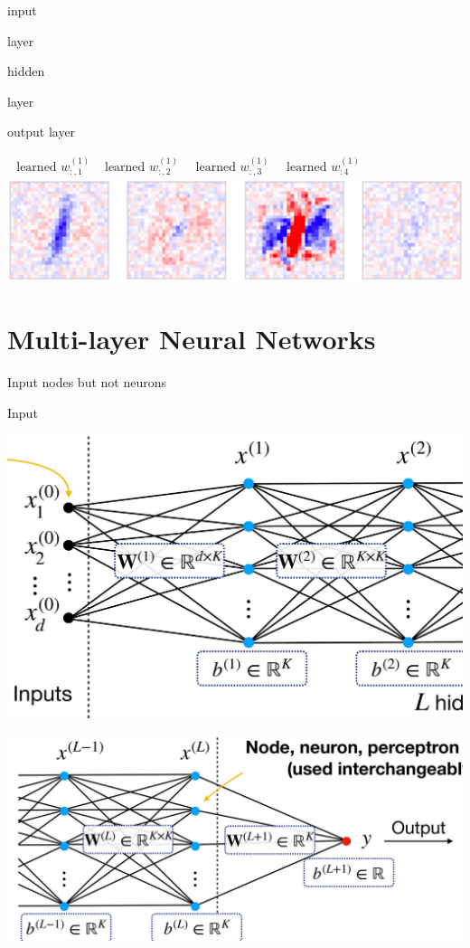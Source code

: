 \documentclass[10pt]{article}
\begin{document}
input

layer

hidden

layer

output layer

$\begin{array}{llll}\text { learned } w_{:, 1}^{(1)} & \text { learned } w_{:, 2}^{(1)} \quad \text { learned } w_{:, 3}^{(1)} \quad \text { learned } w_{: 4}^{(1)}\end{array}$
\includegraphics[max width=\textwidth, center]{2024_01_08_0e0dcffe4bc8c6049046g-07(1)}

\section*{Multi-layer Neural Networks}
Input nodes but not neurons

Input

\begin{center}
\includegraphics[max width=\textwidth]{2024_01_08_0e0dcffe4bc8c6049046g-08}
\end{center}

\begin{center}
\includegraphics[max width=\textwidth]{2024_01_08_0e0dcffe4bc8c6049046g-08(1)}
\end{center}
\end{document}
